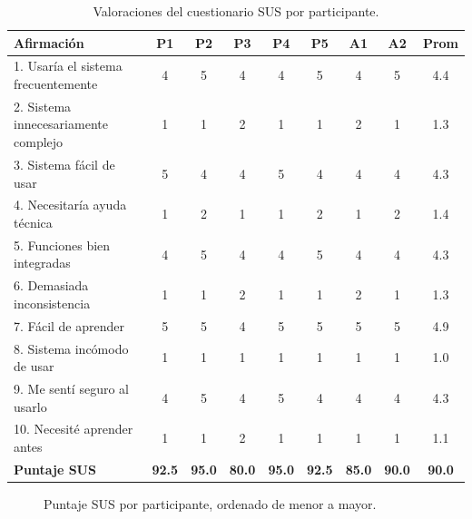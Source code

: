 \begin{table}[H]
\centering
\caption{Valoraciones del cuestionario SUS por participante.}
\label{tab:usabilidad-sus}
\footnotesize
\begin{tabular}{lccccc|cc|c}
\hline
\textbf{Afirmación} & \textbf{P1} & \textbf{P2} & \textbf{P3} & \textbf{P4} & \textbf{P5} & \textbf{A1} & \textbf{A2} & \textbf{Prom} \\
\hline
1. Usaría el sistema frecuentemente & 4 & 5 & 4 & 4 & 5 & 4 & 5 & 4.4 \\
2. Sistema innecesariamente complejo & 1 & 1 & 2 & 1 & 1 & 2 & 1 & 1.3 \\
3. Sistema fácil de usar & 5 & 4 & 4 & 5 & 4 & 4 & 4 & 4.3 \\
4. Necesitaría ayuda técnica & 1 & 2 & 1 & 1 & 2 & 1 & 2 & 1.4 \\
5. Funciones bien integradas & 4 & 5 & 4 & 4 & 5 & 4 & 4 & 4.3 \\
6. Demasiada inconsistencia & 1 & 1 & 2 & 1 & 1 & 2 & 1 & 1.3 \\
7. Fácil de aprender & 5 & 5 & 4 & 5 & 5 & 5 & 5 & 4.9 \\
8. Sistema incómodo de usar & 1 & 1 & 1 & 1 & 1 & 1 & 1 & 1.0 \\
9. Me sentí seguro al usarlo & 4 & 5 & 4 & 5 & 4 & 4 & 4 & 4.3 \\
10. Necesité aprender antes & 1 & 1 & 2 & 1 & 1 & 1 & 1 & 1.1 \\
\hline
\textbf{Puntaje SUS} & \textbf{92.5} & \textbf{95.0} & \textbf{80.0} & \textbf{95.0} & \textbf{92.5} & \textbf{85.0} & \textbf{90.0} & \textbf{90.0} \\
\hline
\end{tabular}
\end{table}

\begin{figure}[H]
    \centering
    \caption{Puntaje SUS por participante, ordenado de menor a mayor.}
    \label{fig:usabilidad-sus}
\end{figure}


